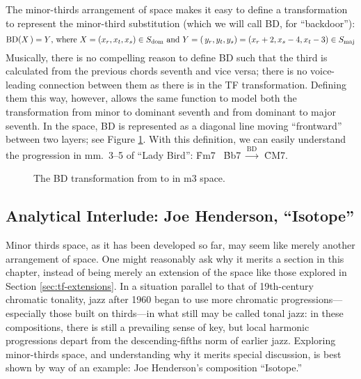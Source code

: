 The minor-thirds arrangement of \tf space makes it easy to define a
transformation to represent the minor-third substitution (which we will call
BD, for ``backdoor''):%
%
\begin{displaymath}
    \mathrm{BD}(X\,) = Y\text{, where}\ X = (x_r, x_t, x_s) \in S_{\mathrm{dom}}
    \text{ and}\
    Y = (\,y_r, y_t, y_s) = (x_r + 2, x_s - 4, x_t - 3) \in S_{\mathrm{maj}}
\end{displaymath}%
%
Musically, there is no compelling reason to define BD such that the third is
calculated from the previous chords seventh and vice versa; there is no
voice-leading connection between them as there is in the TF transformation.
Defining them this way, however, allows the same function to model both the
transformation from minor to dominant seventh and from dominant to major
seventh.\fn{mts-4} In the space, BD is represented as a diagonal line moving
``frontward'' between two layers; see Figure \ref{mts:bd-transformation}. With
this definition, we can easily understand the progression in mm.~3--5 of
``Lady Bird'': \h{Fm7} \TFarrow\ \h{Bb7} $\xrightarrow{\mathrm{BD}}$\ \h{CM7}.

\begin{figure}[tbp]
  \caption[The BD transformation in m3 space.]{The BD transformation from
    \caph{Bb7} to \caph{CM7} in m3 space.}
  \label{mts:bd-transformation}
\end{figure}

\subsection{Analytical Interlude: Joe Henderson, “Isotope”}
\label{sec:henderson-isotope}
\FloatBarrier

Minor thirds space, as it has been developed so far, may seem like merely
another arrangement of \tf space. One might reasonably ask why it merits a
section in this chapter, instead of being merely an extension of the space
like those explored in Section \ref{sec:tf-extensions}. In a situation
parallel to that of 19th-century chromatic tonality, jazz after 1960 began to
use more chromatic progressions---\allowbreak especially those built on
thirds---in what still may be called tonal jazz: in these compositions, there
is still a prevailing sense of key, but local harmonic progressions depart
from the descending-fifths norm of earlier jazz.\fn{mts-5} Exploring
minor-thirds space, and understanding why it merits special discussion, is
best shown by way of an example: Joe Henderson's composition
``Isotope.''


